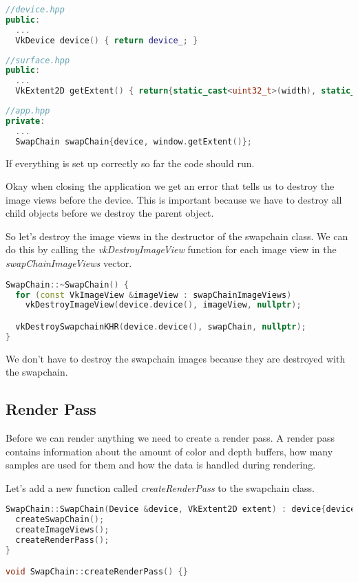 \documentclass[12pt]{report} \usepackage{preamble}
\begin{document}
\begin{lstlisting}[language=C++]
//device.hpp
public:
  ...
  VkDevice device() { return device_; }
\end{lstlisting}

\begin{lstlisting}[language=C++]
//surface.hpp
public:
  ...
  VkExtent2D getExtent() { return{static_cast<uint32_t>(width), static_cast<uint32_t>(height)}; }
\end{lstlisting}

\begin{lstlisting}[language=C++]
//app.hpp
private:
  ...
  SwapChain swapChain{device, window.getExtent()};
\end{lstlisting}

If everything is set up correctly so far the code should run.

Okay when closing the application we get an error that tells us to destroy the image views before the device.
This is important because we have to destroy all child objects before we destroy the parent object.

So let's destroy the image views in the destructor of the swapchain class. We can do this by calling the
\textit{vkDestroyImageView} function for each image view in the \textit{swapChainImageViews} vector.

\begin{lstlisting}[language=C++]
SwapChain::~SwapChain() {
  for (const VkImageView &imageView : swapChainImageViews)
    vkDestroyImageView(device.device(), imageView, nullptr);

  vkDestroySwapchainKHR(device.device(), swapChain, nullptr);
}
\end{lstlisting}

We don't have to destroy the swapchain images because they are destroyed with the swapchain.

\subsection{Render Pass}

Before we can render anything we need to create a render pass. A render pass contains information about
the amount of color and depth buffers, how many samples are used for them and how the data is handled
during rendering.

Let's add a new function called \textit{createRenderPass} to the swapchain class.

\begin{lstlisting}[language=C++]
SwapChain::SwapChain(Device &device, VkExtent2D extent) : device{device}, windowExtent{extent} {
  createSwapChain();
  createImageViews();
  createRenderPass();
}

void SwapChain::createRenderPass() {}
\end{lstlisting}
\end{document}
